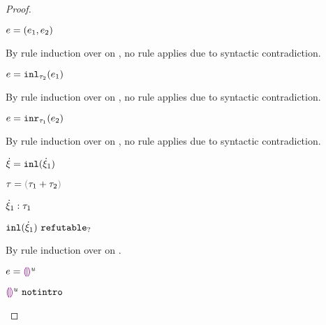 \begin{proof}
\begin{byCases}
\begin{byCases}
      \item[\text{(\ref{rule:IPairL}), (\ref{rule:IPairR}), (\ref{rule:IPair})}] 
      \begin{pfsteps*}
      \item $e=(e_1 , e_2)$ 
      \end{pfsteps*} 
      By rule induction over  on , no rule applies due to syntactic contradiction.
      \item[\text{(\ref{rule:IInl})}] 
      \begin{pfsteps*}
      \item $e=\mathtt{inl}_{\tau_2}({e_1})$ 
      \end{pfsteps*} 
      By rule induction over  on , no rule applies due to syntactic contradiction.
      \item[\text{(\ref{rule:IInr})}] 
      \begin{pfsteps*}
      \item $e=\mathtt{inr}_{\tau_1}({e_2})$ 
      \end{pfsteps*} 
      By rule induction over  on , no rule applies due to syntactic contradiction.
    \end{byCases}
    \item[\text{(\ref{rule:CTInl})}]
    \begin{pfsteps*}
      \item $\dot{\xi} = \mathtt{inl}(\dot{\xi}_1)$ 
      \item $\tau = \tsum{\tau_1}{\tau_2}$ 
      \item $\dot{\xi}_1 : \tau_1$  
      \item $\mathtt{inl}(\dot{\xi}_1) ~\mathtt{refutable}_?$  
      \end{pfsteps*}
      By rule induction over  on .
      \begin{byCases}
        \item[\text{(\ref{rule:IEHole})}]
        \begin{pfsteps*}
        \item $e=\textcolor{violet}{\llparenthesis}\textcolor{violet}{\rrparenthesis}^{u}$ 
        \item $\textcolor{violet}{\llparenthesis}\textcolor{violet}{\rrparenthesis}^{u} ~\mathtt{notintro}$  

\end{pfsteps*}
\end{byCases}
\end{byCases}
\end{proof}
